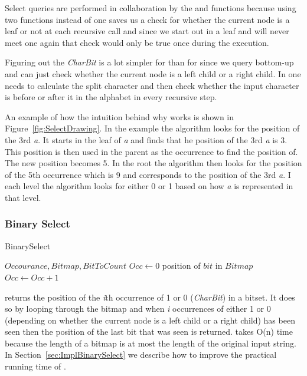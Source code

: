 Select queries are performed in collaboration by the  and  functions because using two functions instead of one saves us a check for whether the current node is a leaf or not at each recursive call and since we start out in a leaf and will never meet one again that check would only be true once during the execution.

Figuring out the \textit{CharBit} is a lot simpler for  than for  since we query bottom-up and can just check whether the current node is a left child or a right child. 
In  one needs to calculate the split character and then check whether the input character is before or after it in the alphabet in every recursive step.

An example of how the intuition behind why  works is shown in Figure~\ref{fig:SelectDrawing}.
In the example the algorithm looks for the position of the 3rd \textit{a}.
It starts in the leaf of \textit{a} and finds that he position of the 3rd \textit{a} is 3. 
This position is then used in the parent as the occurrence to find the position of. 
The new position becomes 5.
In the root the algorithm then looks for the position of the 5th occurrence which is 9 and corresponds to the position of the 3rd \textit{a}.
I each level the algorithm looks for either 0 or 1 based on how \textit{a} is represented in that level.

\subsubsection{Binary Select}
\label{sec:binarySelectDescription}
\begin{algorithm}
\caption{BinarySelect}
\label{alg:binaryselect}
\begin{algorithmic}
 {$Occourance, Bitmap, BitToCount$}
\State $Occ \gets 0$
		\State \Return position of $bit$ in $Bitmap$
	\EndIf
	\State $Occ \gets Occ + 1$
	\EndIf
\EndFor
\EndFunction
\end{algorithmic}
\end{algorithm}

 returns the position of the \textit{i}th occurrence of 1 or 0 (\textit{CharBit}) in a bitset. 
It does so by looping through the bitmap and when \textit{i} occurrences of either 1 or 0 (depending on whether the current node is a left child or a right child) has been seen then the position of the last bit that was seen is returned.
 takes O(n) time because the length of a bitmap is at most the length of the original input string.
In Section~\ref{sec:ImplBinarySelect} we describe how to improve the practical running time of .

